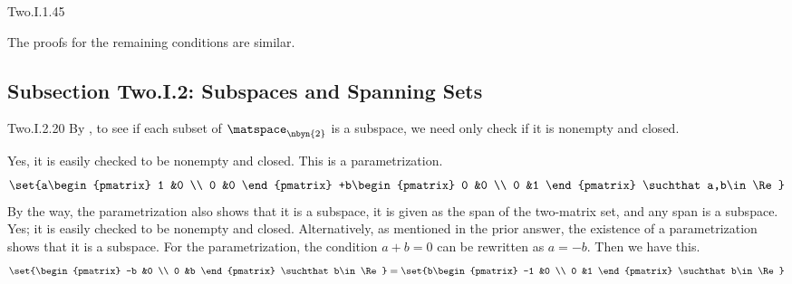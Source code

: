 \begin{ans}{Two.I.1.45}
\begin{exparts}
          The proofs for the remaining conditions are similar.
      \end{exparts}
    
\end{ans}
\subsection{Subsection Two.I.2: Subspaces and Spanning Sets}
\begin{ans}{Two.I.2.20}
      By , to see if each
      subset of $\matspace_{\nbyn{2}}$ is a subspace, we need only
      check if it is nonempty and closed.
      \begin{exparts}
        \partsitem Yes, it is easily checked to be nonempty and closed.
          This is a parametrization.
          \begin{equation*}
            \set{a\begin{pmatrix}
                    1  &0  \\
                    0  &0
                  \end{pmatrix}
                 +b\begin{pmatrix}
                    0  &0  \\
                    0  &1
                   \end{pmatrix}
                 \suchthat a,b\in\Re}
          \end{equation*}
          By the way, the parametrization also shows that it is a subspace,
          it is given as the span of the two-matrix set,
          and any span is a subspace.
        \partsitem Yes; it is easily checked to be nonempty and closed.
         Alternatively, as mentioned in the prior answer, the existence
         of a parametrization shows that it is a subspace.
         For the parametrization,
         the condition $a+b=0$ can be rewritten as $a=-b$.
         Then we have this.
          \begin{equation*}
            \set{\begin{pmatrix}
                    -b  &0  \\
                    0   &b
                  \end{pmatrix}
                 \suchthat b\in\Re}
            =\set{b\begin{pmatrix}
                    -1  &0  \\
                    0   &1
                  \end{pmatrix}
                 \suchthat b\in\Re}

\end{equation*}
\end{exparts}
\end{ans}
